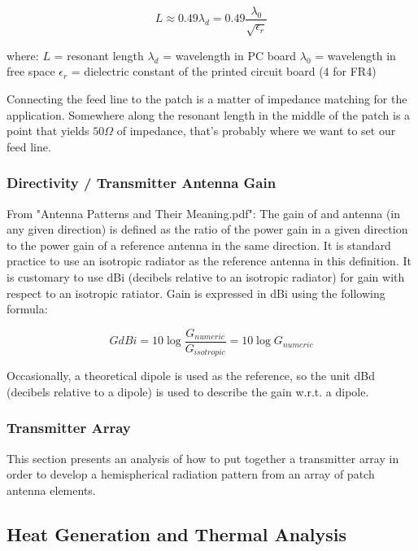 \documentclass[]{article}
\begin{document}
\begin{equation}
L \approx 0.49 \lambda_{d} = 0.49 \frac{\lambda_{0}}{\sqrt{\epsilon_{r}}}
\end{equation}

\noindent  where: \newline
$ L $ = resonant length \newline
$ \lambda_{d} $ = wavelength in PC board \newline
$ \lambda_{0} $ = wavelength in free space \newline
$ \epsilon_{r} $ = dielectric constant of the printed circuit board (4 for FR4)

Connecting the feed line to the patch is a matter of impedance matching for the application. Somewhere along the resonant length in the middle of the patch is a point that yields $ 50 \Omega $ of impedance, that's probably where we want to set our feed line.

\subsubsection{Directivity / Transmitter Antenna Gain}
From "Antenna Patterns and Their Meaning.pdf":
The gain of and antenna (in any given direction) is defined as the ratio of the power gain in a given direction to the power gain of a reference antenna in the same direction. It is standard practice to use an isotropic radiator as the reference antenna in this definition. It is customary to use dBi (decibels relative to an isotropic radiator) for gain with respect to an isotropic ratiator. Gain is expressed in dBi using the following formula:

\begin{equation}
GdBi = 10 \log{ \frac{G_{numeric}}{G_{isotropic}} } = 10 \log{ G_{numeric} }
\end{equation}

Occasionally, a theoretical dipole is used as the reference, so the unit dBd (decibels relative to a dipole) is used to describe the gain w.r.t. a dipole.

\subsubsection{Transmitter Array}

This section presents an analysis of how to put together a transmitter array in order to develop a hemispherical radiation pattern from an array of patch antenna elements.

\subsection{Heat Generation and Thermal Analysis}
\end{document}
